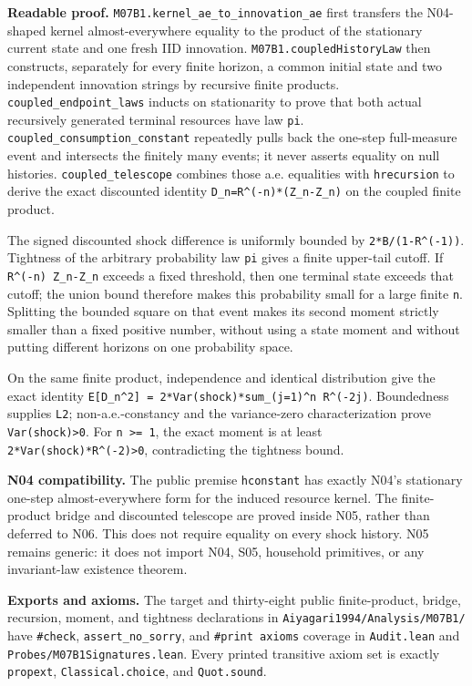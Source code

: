 \documentclass[
  11pt,
]{article}
\let\LedgerOriginalTexttt\texttt
\renewcommand{\texttt}[1]{{\small\LedgerOriginalTexttt{#1}}}
\begin{document}
\textbf{Readable proof.} \texttt{M07B1.kernel\_ae\_to\_innovation\_ae}
first transfers the N04-shaped kernel almost-everywhere equality to the
product of the stationary current state and one fresh IID innovation.
\texttt{M07B1.coupledHistoryLaw} then constructs, separately for every
finite horizon, a common initial state and two independent innovation
strings by recursive finite products. \texttt{coupled\_endpoint\_laws}
inducts on stationarity to prove that both actual recursively generated
terminal resources have law \texttt{pi}.
\texttt{coupled\_consumption\_constant} repeatedly pulls back the
one-step full-measure event and intersects the finitely many events; it
never asserts equality on null histories. \texttt{coupled\_telescope}
combines those a.e. equalities with \texttt{hrecursion} to derive the
exact discounted identity
\texttt{D\_n=R\^{}(-n)*(Z\_n-Z\textquotesingle{}\_n)} on the coupled
finite product.

The signed discounted shock difference is uniformly bounded by
\texttt{2*B/(1-R\^{}(-1))}. Tightness of the arbitrary probability law
\texttt{pi} gives a finite upper-tail cutoff. If
\texttt{R\^{}(-n)\ \textbar{}Z\_n-Z\textquotesingle{}\_n\textbar{}}
exceeds a fixed threshold, then one terminal state exceeds that cutoff;
the union bound therefore makes this probability small for a large
finite \texttt{n}. Splitting the bounded square on that event makes its
second moment strictly smaller than a fixed positive number, without
using a state moment and without putting different horizons on one
probability space.

On the same finite product, independence and identical distribution give
the exact identity
\texttt{E{[}D\_n\^{}2{]}\ =\ 2*Var(shock)*sum\_(j=1)\^{}n\ R\^{}(-2j)}.
Boundedness supplies \texttt{L2}; non-a.e.-constancy and the
variance-zero characterization prove \texttt{Var(shock)\textgreater{}0}.
For \texttt{n\ \textgreater{}=\ 1}, the exact moment is at least
\texttt{2*Var(shock)*R\^{}(-2)\textgreater{}0}, contradicting the
tightness bound.

\textbf{N04 compatibility.} The public premise \texttt{hconstant} has
exactly N04's stationary one-step almost-everywhere form for the induced
resource kernel. The finite-product bridge and discounted telescope are
proved inside N05, rather than deferred to N06. This does not require
equality on every shock history. N05 remains generic: it does not import
N04, S05, household primitives, or any invariant-law existence theorem.

\textbf{Exports and axioms.} The target and thirty-eight public
finite-product, bridge, recursion, moment, and tightness declarations in
\texttt{Aiyagari1994/Analysis/M07B1/} have \texttt{\#check},
\texttt{assert\_no\_sorry}, and \texttt{\#print\ axioms} coverage in
\texttt{Audit.lean} and \texttt{Probes/M07B1Signatures.lean}. Every
printed transitive axiom set is exactly \texttt{propext},
\texttt{Classical.choice}, and \texttt{Quot.sound}.
\end{document}
